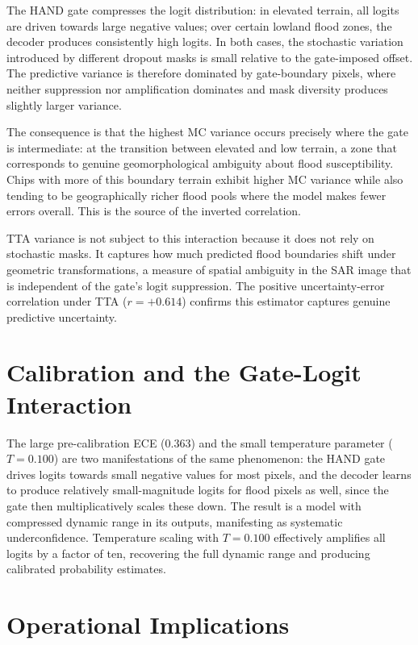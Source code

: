 \documentclass[12pt,oneside]{report}
\begin{document}
The HAND gate compresses the logit distribution: in elevated terrain, all
logits are driven towards large negative values; over certain lowland flood
zones, the decoder produces consistently high logits.
In both cases, the stochastic variation introduced by different dropout masks
is small relative to the gate-imposed offset.
The predictive variance is therefore dominated by gate-boundary pixels, where
neither suppression nor amplification dominates and mask diversity produces
slightly larger variance.

The consequence is that the highest MC variance occurs precisely where the gate
is intermediate: at the transition between elevated and low terrain, a zone
that corresponds to genuine geomorphological ambiguity about flood
susceptibility.
Chips with more of this boundary terrain exhibit higher MC variance while also
tending to be geographically richer flood pools where the model makes fewer
errors overall.
This is the source of the inverted correlation.

TTA variance is not subject to this interaction because it does not rely on
stochastic masks.
It captures how much predicted flood boundaries shift under geometric
transformations, a measure of spatial ambiguity in the SAR image that is
independent of the gate's logit suppression.
The positive uncertainty-error correlation under TTA ($r = +0.614$) confirms
this estimator captures genuine predictive uncertainty.

\section{Calibration and the Gate-Logit Interaction}

The large pre-calibration ECE ($0.363$) and the small temperature parameter
($T = 0.100$) are two manifestations of the same phenomenon: the HAND gate
drives logits towards small negative values for most pixels, and the decoder
learns to produce relatively small-magnitude logits for flood pixels as well,
since the gate then multiplicatively scales these down.
The result is a model with compressed dynamic range in its outputs, manifesting
as systematic underconfidence.
Temperature scaling with $T = 0.100$ effectively amplifies all logits by a
factor of ten, recovering the full dynamic range and producing calibrated
probability estimates.

\section{Operational Implications}
\end{document}
